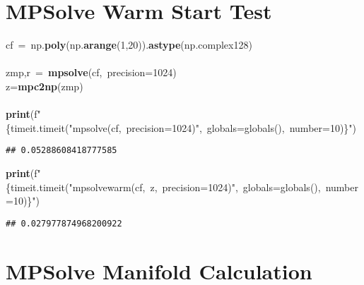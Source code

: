 \documentclass{article}\usepackage[]{graphicx}\usepackage[dvipsnames,table]{xcolor}
\makeatletter
\newcommand{\hlnum}[1]{\textcolor[rgb]{0.686,0.059,0.569}{#1}}%
\newcommand{\hlsng}[1]{\textcolor[rgb]{0.192,0.494,0.8}{#1}}%
\newcommand{\hlopt}[1]{\textcolor[rgb]{0,0,0}{#1}}%
\newcommand{\hldef}[1]{\textcolor[rgb]{0.345,0.345,0.345}{#1}}%
\newcommand{\hlkwa}[1]{\textcolor[rgb]{0.161,0.373,0.58}{\textbf{#1}}}%
\newcommand{\hlkwb}[1]{\textcolor[rgb]{0.69,0.353,0.396}{#1}}%
\newcommand{\hlkwd}[1]{\textcolor[rgb]{0.737,0.353,0.396}{\textbf{#1}}}%
\let\hlipl\hlkwb
\newenvironment{kframe}{%
 \def\at@end@of@kframe{}%
 \ifinner\ifhmode%
  \def\at@end@of@kframe{\end{minipage}}%
  \begin{minipage}{\columnwidth}%
 \fi\fi%
 \def\FrameCommand##1{\hskip\@totalleftmargin \hskip-\fboxsep
 \colorbox{shadecolor}{##1}\hskip-\fboxsep
     \hskip-\linewidth \hskip-\@totalleftmargin \hskip\columnwidth}%
 \MakeFramed {\advance\hsize-\width
   \@totalleftmargin\z@ \linewidth\hsize
   \@setminipage}}%
 {\par\unskip\endMakeFramed%
 \at@end@of@kframe}
\newenvironment{knitrout}{}{} %
\makeatother
\begin{document}
\newpage
\section{MPSolve Warm Start Test}
\begin{center}
\begin{minipage}[m]{18cm}
\begin{knitrout}\small
{}\color{fgcolor}\begin{kframe}
\noindent
\ttfamily
\hldef{cf\ }\hlopt{=\ }\hldef{np}\hlopt{.}\hldef{}\hlkwd{poly}\hldef{}\hlopt{(}\hldef{np}\hlopt{.}\hldef{}\hlkwd{arange}\hldef{}\hlopt{(}\hldef{}\hlnum{1}\hldef{}\hlopt{,}\hldef{}\hlnum{20}\hldef{}\hlopt{)).}\hldef{}\hlkwd{astype}\hldef{}\hlopt{(}\hldef{np}\hlopt{.}\hldef{complex128}\hlopt{)\ }\hldef{}\hspace*{\fill}\\
\hldef{}\hspace*{\fill}\\
\hldef{zmp}\hlopt{,}\hldef{r\ }\hlopt{=\ }\hldef{}\hlkwd{mpsolve}\hldef{}\hlopt{(}\hldef{cf}\hlopt{,\ }\hldef{precision}\hlopt{=}\hldef{}\hlnum{1024}\hldef{}\hlopt{)}\hspace*{\fill}\\
\hldef{z}\hlopt{=}\hldef{}\hlkwd{mpc2np}\hldef{}\hlopt{(}\hldef{zmp}\hlopt{)}\hspace*{\fill}\\
\hldef{}\hspace*{\fill}\\
\hldef{}\hlkwa{print}\hldef{}\hlopt{(}\hldef{f}\hlsng{"}\hlipl{\{timeit.timeit("mpsolve(cf,\ precision=1024)",\ globals=globals(),\ number=10)\}}\hlsng{"}\hldef{}\hlopt{)}\hldef{}\hspace*{\fill}
\mbox{}
\normalfont
\begin{verbatim}
## 0.05288608418777585
\end{verbatim}
\noindent
\ttfamily
\hldef{}\hlkwa{print}\hldef{}\hlopt{(}\hldef{f}\hlsng{"}\hlipl{\{timeit.timeit("mpsolve\textunderscore warm(cf,\ z,\ precision=1024)",\ globals=globals(),\ number=10)\}}\hlsng{"}\hldef{}\hlopt{)}\hldef{}\hspace*{\fill}
\mbox{}
\normalfont
\begin{verbatim}
## 0.027977874968200922
\end{verbatim}
\end{kframe}
\end{knitrout}
\end{minipage}
\end{center}

\newpage
\section{MPSolve Manifold Calculation}
\begin{center}
\begin{minipage}[m]{18cm}

\end{minipage}
\end{center}
\end{document}
